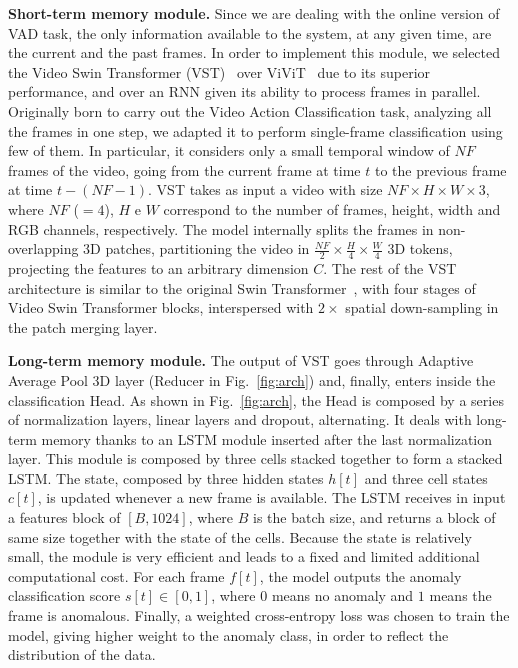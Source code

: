 \noindent\textbf{Short-term memory module.}
Since we are dealing with the online version of VAD task, the only information available to the system, at any given time, are the current and the past frames.
In order to implement this module, we selected the Video Swin Transformer (VST)~\cite{liu_video_2022} over ViViT~\cite{Arnab_2021_ICCV} due to its superior performance, and over an RNN given its ability to process frames in parallel.
Originally born to carry out the Video Action Classification task, analyzing all the frames in one step, we adapted it to perform single-frame classification using few of them.
In particular, it considers only a small temporal window of $\mathit{NF}$ frames of the video, going from the current frame at time $t$ to the previous frame at time $t-\left(\mathit{NF}-1\right)$.
VST takes as input a video with size $\mathit{NF} \times H \times W \times 3$, where $\mathit{NF}$ ($=4$), $H$ e $W$ correspond to the number of frames, height, width and RGB channels, respectively.
The model internally splits the frames in non-overlapping 3D patches, partitioning the video in $\frac{\mathit{NF}}{2} \times \frac{H}{4} \times \frac{W}{4}$ 3D tokens, projecting the features to an arbitrary dimension $C$.
The rest of the VST architecture is similar to the original Swin Transformer~\cite{liu2021Swin}, with four stages of Video Swin Transformer blocks, interspersed with $2\times$ spatial down-sampling in the patch merging layer.

\noindent\textbf{Long-term memory module.}
The output of VST goes through Adaptive Average Pool 3D layer (Reducer in Fig.~\ref{fig:arch}) and, finally, enters inside the classification Head.
As shown in Fig.~\ref{fig:arch}, the Head is composed by a series of normalization layers, linear layers and dropout, alternating. 
It deals with long-term memory thanks to an LSTM module inserted after the last normalization layer.
This module is composed by three cells stacked together to form a stacked LSTM.
The state, composed by three hidden states $h[t]$ and three cell states $c[t]$, is updated whenever a new frame is available.
The LSTM receives in input a features block of $[B, 1024]$, where $B$ is the batch size, and returns a block of same size together with the state of the cells.
Because the state is relatively small, the module is very efficient and leads to a fixed and limited additional computational cost.
For each frame $f[t]$, the model outputs the anomaly classification score $s[t] \in [0,1]$, where $0$ means no anomaly and $1$ means the frame is anomalous.
Finally, a weighted cross-entropy loss was chosen to train the model, giving higher weight to the anomaly class, in order to reflect the distribution of the data.

